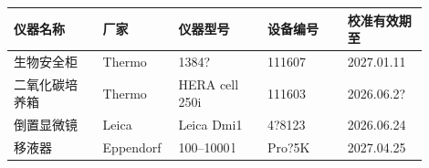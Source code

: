 \documentclass[UTF8,10pt,a4paper,fontset=fandol]{ctexart}
\newcommand{\fieldvalue}[1]{#1}
\newcommand{\handwritten}[1]{#1}
\begin{document}
\begin{center}
\small
\begin{tabular}{|p{0.20\linewidth}|p{0.14\linewidth}|p{0.20\linewidth}|p{0.18\linewidth}|p{0.18\linewidth}|}
\hline
仪器名称 & 厂家 & 仪器型号 & 设备编号 & 校准有效期至 \\ \hline
生物安全柜 &
\fieldvalue{Thermo} &
\fieldvalue{\handwritten{1384?}} &
\fieldvalue{\handwritten{111607}} &
\fieldvalue{\handwritten{2027.01.11}}
\\ \hline
二氧化碳培养箱 &
\fieldvalue{Thermo} &
\fieldvalue{HERA cell 250i} &
\fieldvalue{\handwritten{111603}} &
\fieldvalue{\handwritten{2026.06.2?}}
\\ \hline
倒置显微镜 &
\fieldvalue{Leica} &
\fieldvalue{Leica Dmi1} &
\fieldvalue{\handwritten{4?8123}} &
\fieldvalue{\handwritten{2026.06.24}}
\\ \hline
移液器 &
\fieldvalue{Eppendorf} &
\fieldvalue{\handwritten{100--1000\,\textmu l}} &
\fieldvalue{\handwritten{Pro?5K}} &
\fieldvalue{\handwritten{2027.04.25}}
\\ \hline
\end{tabular}
\end{center}
\end{document}
